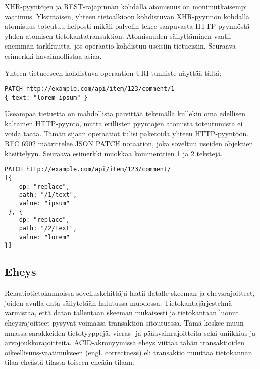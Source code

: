 \documentclass[finnish,twoside,censored,csm,sw-track-2018]{HYthesisML}
\begin{document}
XHR-pyyntöjen ja REST-rajapinnan kohdalla atomisuus on monimutkaisempi vaatimus. Yksittäisen, yhteen tietoalkioon kohdistuvan XHR-pyynnön kohdalla atomisuus toteutuu helposti mikäli palvelin tekee saapuvasta HTTP-pyynnöstä yhden atomisen tietokantatransaktion. Atomisuuden säilyttäminen vaatii enemmän tarkkuutta, jos operaatio kohdistuu useisiin tietueisiin. Seuraava esimerkki havainnollistaa asiaa.

Yhteen tietueeseen kohdistuva operaation URI-tunniste näyttää tältä:

\begin{Verbatim}[fontsize=\small]
PATCH http://example.com/api/item/123/comment/1
{ text: "lorem ipsum" }
\end{Verbatim}

Useampaa tietuetta on mahdollista päivittää tekemällä kullekin oma edellisen kaltainen HTTP-pyyntö, mutta erillisten pyyntöjen atomista toteutumista ei voida taata. Tämän sijaan operaatiot tulisi paketoida yhteen HTTP-pyyntöön. RFC 6902 \citep{rfc6902} määrittelee JSON PATCH notaation, joka soveltuu useiden objektien käsittelyyn. Seuraava esimerkki muokkaa kommenttien 1 ja 2 tekstejä.

\begin{Verbatim}[fontsize=\small]
PATCH http://example.com/api/item/123/comment/
[{ 
    op: "replace",
    path: "/1/text",
    value: "ipsum"
 }, {
    op: "replace",
    path: "/2/text",
    value: "lorem"
}]
\end{Verbatim}

\subsection{Eheys}

Relaatiotietokannoissa sovelluskehittäjä laatii datalle skeeman ja eheysrajoitteet, joiden avulla data säilytetään halutussa muodossa. Tietokantajärjestelmä varmistaa, että datan tallentaan skeeman mukaisesti ja tietokantaan luonut eheysrajoitteet pysyvät voimassa transaktion sitoutuessa. Tämä koskee muun muassa sarakkeiden tietotyyppejä, vieras- ja pääavainrajoitteita sekä uniikkius ja arvojoukkorajoitteita. ACID-akronyymissä eheys viittaa tähän transaktioiden oikeellisuus-vaatimukseen (engl. correctness) eli transaktio muuttaa tietokannan tilaa eheästä tilasta toiseen eheään tilaan.
\end{document}
